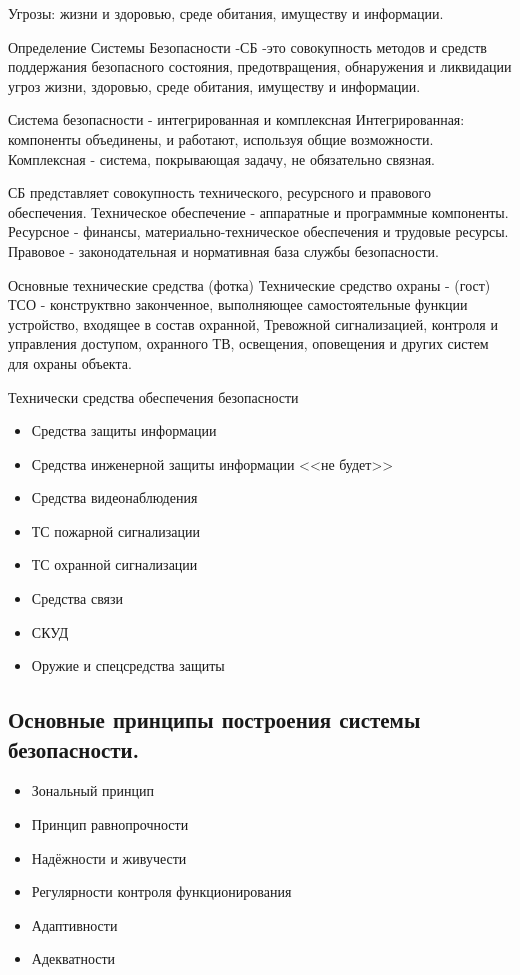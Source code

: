 \documentclass[a4paper,12pt]{report}
\begin{document}
	Угрозы: жизни и здоровью, среде обитания, имуществу и информации.

	Определение Системы Безопасности -СБ -это совокупность методов и средств поддержания безопасного состояния, предотвращения, обнаружения и ликвидации угроз жизни, здоровью, среде обитания, имуществу и информации.

	Система безопасности - интегрированная и комплексная
		Интегрированная: компоненты объединены, и работают, используя общие возможности.
		Комплексная - система, покрывающая задачу, не обязательно связная.

	СБ представляет совокупность технического, ресурсного и правового обеспечения.
	Техническое обеспечение - аппаратные и программные компоненты.
	Ресурсное - финансы, материально-техническое обеспечения и трудовые ресурсы.
	Правовое - законодательная и нормативная база службы безопасности.



	Основные технические средства (фотка)
	Технические средство охраны - (гост) ТСО - конструктвно законченное, выполняющее самостоятельные функции устройство, входящее в состав охранной, Тревожной сигнализацией, контроля и управления доступом, охранного ТВ, освещения, оповещения и других систем для охраны объекта.

	Технически средства обеспечения безопасности
	\begin{itemize}
	\item	Средства защиты информации
	\item	Средства инженерной защиты информации <<не будет>>
	\item	Средства видеонаблюдения
	\item	ТС пожарной сигнализации
	\item	ТС охранной сигнализации
	\item	Средства связи
	\item	СКУД
	\item	Оружие и спецсредства защиты
	\end{itemize}


	\subsection{Основные принципы построения системы безопасности.	}
	\begin{itemize}
	\item	Зональный принцип
	\item	Принцип равнопрочности
	\item	Надёжности и живучести
	\item	Регулярности контроля функционирования
	\item	Адаптивности
	\item	Адекватности
	\end{itemize}
\end{document}
